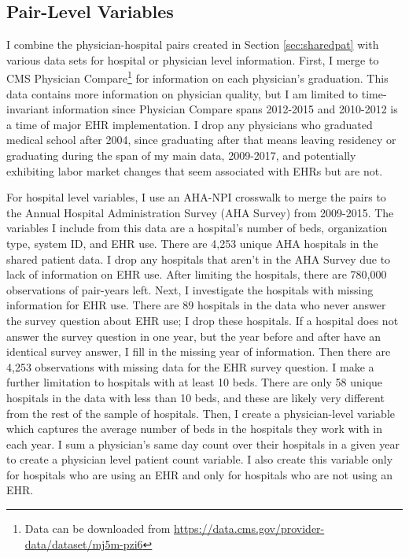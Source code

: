 \documentclass[12pt]{article}
\begin{document}
\subsection{Pair-Level Variables}

I combine the physician-hospital pairs created in Section \ref{sec:sharedpat} with various data sets for hospital or physician level information. First, I merge to CMS Physician Compare\footnote{Data can be downloaded from \hyperlink{https://data.cms.gov/provider-data/dataset/mj5m-pzi6}{https://data.cms.gov/provider-data/dataset/mj5m-pzi6}} for information on each physician's graduation. This data contains more information on physician quality, but I am limited to time-invariant information since Physician Compare spans 2012-2015 and 2010-2012 is a time of major EHR implementation. I drop any physicians who graduated medical school after 2004, since graduating after that means leaving residency or graduating during the span of my main data, 2009-2017, and potentially exhibiting labor market changes that seem associated with EHRs but are not. 

For hospital level variables, I use an AHA-NPI crosswalk to merge the pairs to the Annual Hospital Administration Survey (AHA Survey) from 2009-2015. The variables I include from this data are a hospital's number of beds, organization type, system ID, and EHR use. There are 4,253 unique AHA hospitals in the shared patient data. I drop any hospitals that aren't in the AHA Survey due to lack of information on EHR use. After limiting the hospitals, there are 780,000 observations of pair-years left. Next, I investigate the hospitals with missing information for EHR use. There are 89 hospitals in the data who never answer the survey question about EHR use; I drop these hospitals. If a hospital does not answer the survey question in one year, but the year before and after have an identical survey answer, I fill in the missing year of information. Then there are 4,253 observations with missing data for the EHR survey question. I make a further limitation to hospitals with at least 10 beds. There are only 58 unique hospitals in the data with less than 10 beds, and these are likely very different from the rest of the sample of hospitals. Then, I create a physician-level variable which captures the average number of beds in the hospitals they work with in each year. I sum a physician's same day count over their hospitals in a given year to create a physician level patient count variable. I also create this variable only for hospitals who are using an EHR and only for hospitals who are not using an EHR.
\end{document}
